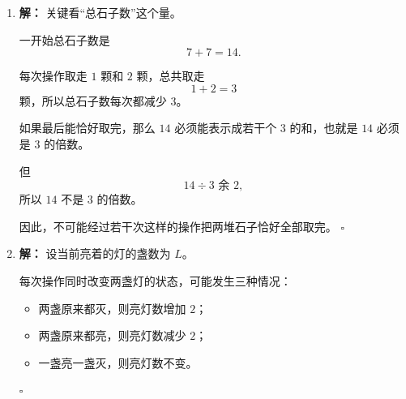 \documentclass[11pt,a4paper,fontset=fandol]{ctexart}
\theoremstyle{formalexample}
\newenvironment{solution}{\par\noindent\textbf{解：}}{\hfill$\square$\par}
\begin{document}
\begin{enumerate}
\begin{solution}
  若任意两个被选出的数的和都不能被 $3$ 整除，那么：

  \begin{itemize}
    \item 0 类中不能选两个，因为 $0+0\equiv 0\pmod 3$；
    \item 1 类和 2 类不能同时都选，因为 $1+2\equiv 0\pmod 3$。
  \end{itemize}

  所以选择方式只能是下面两种：
  \begin{itemize}
    \item 从 1 类中任意选若干个，再从 0 类里最多选 1 个；
    \item 从 2 类中任意选若干个，再从 0 类里最多选 1 个。
  \end{itemize}

  由于 1 类和 2 类各有 $5$ 个，所以最多可选
  \[
  5+1=6
  \]
  个。

  例如选
  \[
  \{1,4,7,10,13,3\}
  \]
  就满足条件：
  \begin{itemize}
    \item 任意两个 1 类数相加，余数为 $2$；
    \item 0 类数与 1 类数相加，余数为 $1$；
    \item 都不会是 $0$（模 $3$）。
  \end{itemize}

  所以最多能选 \textbf{6 个数}。
  \end{solution}

  \item \begin{solution}
  关键看“总石子数”这个量。

  一开始总石子数是
  \[
  7+7=14.
  \]

  每次操作取走 $1$ 颗和 $2$ 颗，总共取走
  \[
  1+2=3
  \]
  颗，所以总石子数每次都减少 $3$。

  如果最后能恰好取完，那么 $14$ 必须能表示成若干个 $3$ 的和，也就是 $14$ 必须是 $3$ 的倍数。

  但
  \[
  14\div 3 \text{ 余 }2,
  \]
  所以 $14$ 不是 $3$ 的倍数。

  因此，不可能经过若干次这样的操作把两堆石子恰好全部取完。
  \end{solution}

  \item \begin{solution}
  设当前亮着的灯的盏数为 $L$。

  每次操作同时改变两盏灯的状态，可能发生三种情况：
  \begin{itemize}
    \item 两盏原来都灭，则亮灯数增加 $2$；
    \item 两盏原来都亮，则亮灯数减少 $2$；
    \item 一盏亮一盏灭，则亮灯数不变。
  \end{itemize}


\end{solution}
\end{enumerate}
\end{document}
